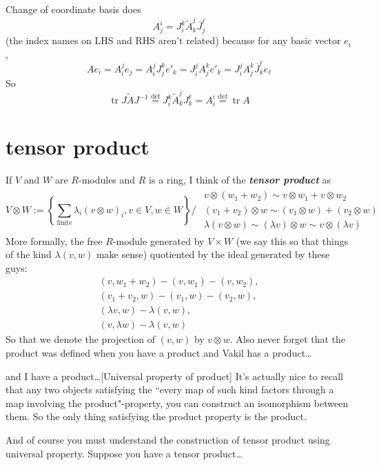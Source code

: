 Change of coordinate basis does
\[A^i_j=J^k_i \tilde{A}^j_k \overline{J}^\ell_j\]
(the index names on LHS and RHS aren't related) because for any basic vector \(e_i\),
\[Ae_i=A^j_i e_j=A^j_i J^k_j e'_k=J_i^jA_j^ke'_k=J_i^jA_j^k \overline{J}_k^\ell e_\ell\]
So
\[\operatorname{tr}J\tilde{A}J^{-1}\overset{\operatorname{def}}{=}J^k_i\tilde{A}^j_k J^\ell_k=A^i_i \overset{\operatorname{def}}{=}\operatorname{tr}A\]


\section{tensor product}

\begin{defn}\leavevmode
If \(V\) and \(W\) are \(R\)-modules and \(R\) is a ring, I think of the \textit{\textbf{tensor product}} as
\[V\otimes W:=\left\{\sum_{\text{finite} }\lambda_i (v \otimes w)_i, v \in V, w \in W \right\} \Big/ \substack{\begin{array}{c}v \otimes (w_1+w_2)\sim v\otimes w_1+ v\otimes w_2\\ (v_1+v_2) \otimes w \sim(v_1 \otimes w)+(v_2 \otimes w)\\ \lambda(v \otimes w)\sim(\lambda v) \otimes w \sim  v \otimes(\lambda v)\end{array}}\]
More formally, the free \(R\)-module generated by \(V \times W\) (we say this so that things of the kind \(\lambda(v,w)\) make sense) quotiented by the ideal generated by these guys:
\begin{gather*}(v,w_1+w_2)-(v,w_1)-(v,w_2),\\ (v_1+v_2,w)-(v_1,w)-(v_2,w),\\ (\lambda v,w)-\lambda(v,w),\\(v,\lambda w)-\lambda(v,w)\end{gather*}
So that we denote the projection of \((v,w)\) by \(v \otimes w\). Also never forget that the product was defined when you have a product and Vakil has a product…
\begin{thing7}{and I have a product…}[Universal property of product]\leavevmode
It's actually nice to recall that any two objects satisfying the ``every map of such kind factors through a map involving the product"-property, you can construct an isomorphism between them. So the only thing satisfying the product property is the product.
\end{thing7}
\end{defn}
And of course you must understand the construction of tensor product using universal property. Suppose you have a tensor product…

